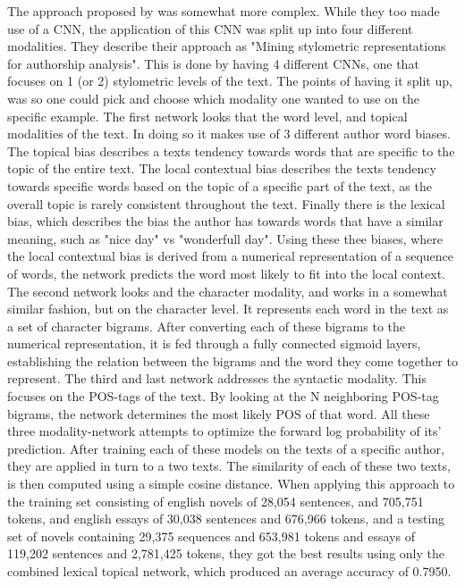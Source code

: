 The approach proposed by \cite{ding2016} was somewhat more complex. While they
too made use of a \gls{CNN}, the application of this \gls{CNN} was split up into
four different modalities. They describe their approach as "Mining stylometric
representations for authorship analysis". This is done by having 4 different
\gls{CNN}s, one that focuses on 1 (or 2) stylometric levels of the text. The
points of having it split up, was so one could pick and choose which modality
one wanted to use on the specific example. The first network looks that the
word level, and topical modalities of the text. In doing so it makes use of
3 different author word biases. The topical bias describes a texts tendency
towards words that are specific to the topic of the entire text. The local
contextual bias describes the texts tendency towards specific words based on the
topic of a specific part of the text, as the overall topic is rarely consistent
throughout the text. Finally there is the lexical bias, which describes the bias
the author has towards words that have a similar meaning, such as "nice day"
vs "wonderfull day". Using these thee biases, where the local contextual bias
is derived from a numerical representation of a sequence of words, the network
predicts the word most likely to fit into the local context. The second network
looks and the character modality, and works in a somewhat similar fashion,
but on the character level. It represents each word in the text as a set of
character bigrams. After converting each of these bigrams to the numerical
representation, it is fed through a fully connected sigmoid layers, establishing
the relation between the bigrams and the word they come together to represent.
The third and last network addresses the syntactic modality. This focuses on
the \gls{POS}-tags of the text. By looking at the N neighboring \gls{POS}-tag
bigrams, the network determines the most likely \gls{POS} of that word. All
these three modality-network attempts to optimize the forward log probability of
its' prediction. After training each of these models on the texts of a specific
author, they are applied in turn to a two texts. The similarity of each of these
two texts, is then computed using a simple cosine distance. When applying this
approach to the training set consisting of english novels of 28,054 sentences,
and 705,751 tokens, and english essays of 30,038 sentences and 676,966 tokens,
and a testing set of novels containing 29,375 sequences and 653,981 tokens and
essays of 119,202 sentences and 2,781,425 tokens, they got the best results
using only the combined lexical topical network, which produced an average
accuracy of 0.7950.

